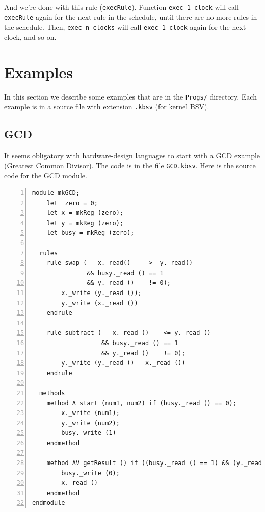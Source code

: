 \documentclass[11pt]{article}
\newcommand{\term}[1]{\texttt{#1}}
\begin{document}
And we're done with this rule (\term{execRule}). Function
\verb|exec_1_clock| will call \term{execRule} again for the next rule
in the schedule, until there are no more rules in the schedule.  Then,
\verb|exec_n_clocks| will call \verb|exec_1_clock| again for the next
clock, and so on.


\section{Examples}

\label{sec_examples}

In this section we describe some examples that are in the
\term{Progs/} directory.  Each example is in a source file with
extension \term{.kbsv} (for kernel BSV).


\subsection{GCD}

It seems obligatory with hardware-design languages to start with a GCD
example (Greatest Common Divisor).  The code is in the file
\term{GCD.kbsv}. Here is the source code for the GCD module.

\begin{Verbatim}[frame=single, numbers=left, commandchars=\\\{\}]
module mkGCD;
    let  zero = 0;
    let x = mkReg (zero);
    let y = mkReg (zero);
    let busy = mkReg (zero);

  rules
    rule swap (   x._read()     >  y._read()
               && busy._read () == 1
               && y._read ()    != 0);
        x._write (y._read ());
        y._write (x._read ())
    endrule

    rule subtract (   x._read ()    <= y._read ()
                   && busy._read () == 1
                   && y._read ()    != 0);
        y._write (y._read () - x._read ())
    endrule

  methods
    method A start (num1, num2) if (busy._read () == 0);
        x._write (num1);
        y._write (num2);
        busy._write (1)
    endmethod

    method AV getResult () if ((busy._read () == 1) && (y._read () == 0));
        busy._write (0);
        x._read ()
    endmethod
endmodule
\end{Verbatim}
\end{document}
